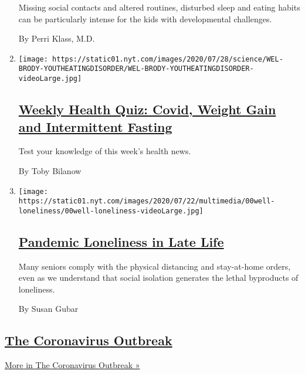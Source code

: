 \begin{enumerate}
  Missing social contacts and altered routines, disturbed sleep and
  eating habits can be particularly intense for the kids with
  developmental challenges.

  By Perri Klass, M.D.
\item
  \texttt{[image: https://static01.nyt.com/images/2020/07/28/science/WEL-BRODY-YOUTHEATINGDISORDER/WEL-BRODY-YOUTHEATINGDISORDER-videoLarge.jpg]}

  \hypertarget{weekly-health-quiz-covid-weight-gain-and-intermittent-fasting}{%
  \subsection{\texorpdfstring{\href{/interactive/2020/07/31/well/live/31healthquiz-07312020.html}{Weekly
  Health Quiz: Covid, Weight Gain and Intermittent
  Fasting}}{Weekly Health Quiz: Covid, Weight Gain and Intermittent Fasting}}\label{weekly-health-quiz-covid-weight-gain-and-intermittent-fasting}}

  Test your knowledge of this week's health news.

  By Toby Bilanow
\item
  \texttt{[image: https://static01.nyt.com/images/2020/07/22/multimedia/00well-loneliness/00well-loneliness-videoLarge.jpg]}

  \hypertarget{pandemic-loneliness-in-late-life}{%
  \subsection{\texorpdfstring{\href{/2020/07/30/well/mind/pandemic-loneliness-in-late-life.html}{Pandemic
  Loneliness in Late
  Life}}{Pandemic Loneliness in Late Life}}\label{pandemic-loneliness-in-late-life}}

  Many seniors comply with the physical distancing and stay-at-home
  orders, even as we understand that social isolation generates the
  lethal byproducts of loneliness.

  By Susan Gubar
\end{enumerate}

\hypertarget{the-coronavirus-outbreak}{%
\subsection{\texorpdfstring{\href{/news-event/coronavirus}{The
Coronavirus
Outbreak}}{The Coronavirus Outbreak}}\label{the-coronavirus-outbreak}}

\href{/news-event/coronavirus}{More in The Coronavirus Outbreak »}

